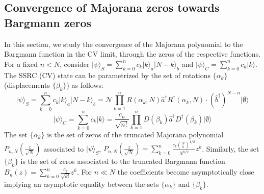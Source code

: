 \documentclass[aps,prl,showpacs,twocolumn]{revtex4-2}
\providecommand{\ket}[1]{\lvert #1 \rangle}
\providecommand{\ket}[1]{\lvert #1 \rangle}
\providecommand{\ket}[1]{\lvert #1 \rangle}
\providecommand{\ket}[1]{\lvert #1 \rangle}
\begin{document}
\subsection{Convergence of Majorana zeros towards Bargmann zeros}
In this section, we study the convergence of the Majorana polynomial to the Bargmann function in the CV limit, through the zeros of the respective functions. For a fixed $n <N$, consider $\ket{\psi}_{S } =\sum_{k=0}^{n} c_k \ket{k}_a\ket{N-k}_b$ and $\ket{\psi}_{C} = \sum_{k=0}^{n} c_k \ket{k}$. The SSRC (CV) state can be parametrized by the set of rotations $\{\alpha_k\}$ (displacements $\{\beta_k\}$) as follows:
	\begin{equation}\label{s_eq}
		\ket{\psi}_{S} =\sum_{k=0}^{n} c_k \ket{k}_a\ket{N-k}_b= \mathcal{N}\prod_{k=1}^{n} R(\alpha_k,N)\hat{a}^\dagger R^\dagger(\alpha_k, N) \cdot (\hat{b}^\dagger)^{N-n} \ket{\emptyset}
	\end{equation}
	\begin{equation}\label{CV general}
		\ket{\psi}_{C} = \sum_{k=0}^{n} c_k \ket{k} = \frac{c_n}{\sqrt{n!}}\prod_{k=1}^{n} D(\beta_k)\hat{a}^\dagger D^\dagger(\beta_k)  \ket{\emptyset}
	\end{equation}
The set $\{\alpha_k\}$ is the set of zeros of the truncated Majorana polynomial $P_{n,N}\left(\frac{z}{\sqrt{N}}\right)$ associated to $\ket{\psi}_{S}$, $P_{n,N}\left(\frac{z}{\sqrt{N}}\right)= \sum_{k=0}^n\frac{c_k\binom{N}{k}^{1/2}}{N^{k/2}}z^k$. Similarly, the set $\{\beta_k\}$ is the set of zeros associated to the truncated Bargmann function $B_n(z)=\sum_{k=0}^n \frac{c_k}{\sqrt{k!}}z^k $. For $n \ll N$ the coefficients become asymptotically close implying an asymptotic equality between the sets $\{\alpha_k\}$ and $\{\beta_k\}$.
\end{document}
